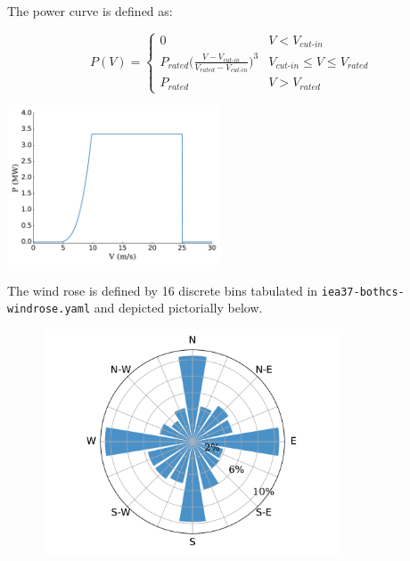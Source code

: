\documentclass{article}
\begin{document}
        The power curve is defined as:   

        \begin{minipage}{0.5\textwidth}
            \begin{equation*}
                P(V) = 
                \begin{cases} 
                    0 & V < V_{\textit{cut-in}} \\
                    P_{\textit{rated}}\bigg(\frac{V-V_{\textit{cut-in}}}{V_{\textit{rated}}-V_{\textit{cut-in}}}\bigg)^3 & V_{\textit{cut-in}}\leq V \leq V_{\textit{rated}} \\
                    P_{\textit{rated}} & V > V_{\textit{rated}}
                \end{cases}
            \label{eq:power}
            \end{equation*}
        \end{minipage}\quad
        \begin{minipage}{0.5\textwidth}
            \includegraphics[width=2.5in]{iea37-335mw-pcurve}
        \end{minipage}


        The wind rose is defined by 16 discrete bins tabulated in \texttt{iea37-bothcs-windrose.yaml} and depicted pictorially below.

        \begin{figure}[h!]
            \centering
            \includegraphics[width=3.5in]{iea37-wflocs-windrose}
        \end{figure}
\end{document}
